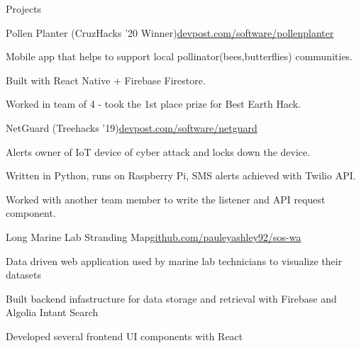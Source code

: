 \documentclass{resume} %
\begin{document}
\begin{rSection}{Projects}

    \begin{rSubsection}{Pollen Planter (CruzHacks '20 Winner)}{\href{https://www.devpost.com/software/pollenplanter}{devpost.com/software/pollenplanter}}{}{}
        \item Mobile app that helps to support local pollinator(bees,butterflies) communities.
        \item Built with React Native + Firebase Firestore.
        \item Worked in team of 4 - took the 1st place prize for Best Earth Hack.
    \end{rSubsection}

    \begin{rSubsection}{NetGuard (Treehacks '19)}{\href{https://www.devpost.com/software/netguard}{devpost.com/software/netguard}}{}{}
        \item Alerts owner of IoT device of cyber attack and locks down the device.
        \item Written in Python, runs on Raspberry Pi, SMS alerts achieved with Twilio API.
        \item Worked with another team member to write the listener and API request component.
    \end{rSubsection}

    \begin{rSubsection}{Long Marine Lab Stranding Map}{\href{https://github.com/pauleyashley92/sos-wa}{github.com/pauleyashley92/sos-wa}}{}{}
        \item Data driven web application used by marine lab technicians to visualize their datasets 
        \item Built backend infastructure for data storage and retrieval with Firebase and Algolia Intant Search
        \item Developed several frontend UI components with React
    \end{rSubsection}

\end{rSection}






\end{document}

